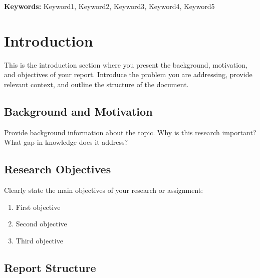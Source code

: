 \documentclass[12pt,a4paper]{article}
\theoremstyle{definition}
\begin{document}
\vspace{1cm}

\noindent\textbf{Keywords:} Keyword1, Keyword2, Keyword3, Keyword4, Keyword5

\newpage
\tableofcontents
\newpage

\listoffigures
\newpage
\listoftables
\newpage


\section{Introduction}
\label{sec:introduction}

This is the introduction section where you present the background, motivation,
and objectives of your report. Introduce the problem you are addressing, provide
relevant context, and outline the structure of the document.

\subsection{Background and Motivation}
\label{subsec:background}

Provide background information about the topic. Why is this research important?
What gap in knowledge does it address?

\subsection{Research Objectives}
\label{subsec:objectives}

Clearly state the main objectives of your research or assignment:
\begin{enumerate}
    \item First objective
    \item Second objective
    \item Third objective
\end{enumerate}

\subsection{Report Structure}
\label{subsec:structure}
\end{document}
